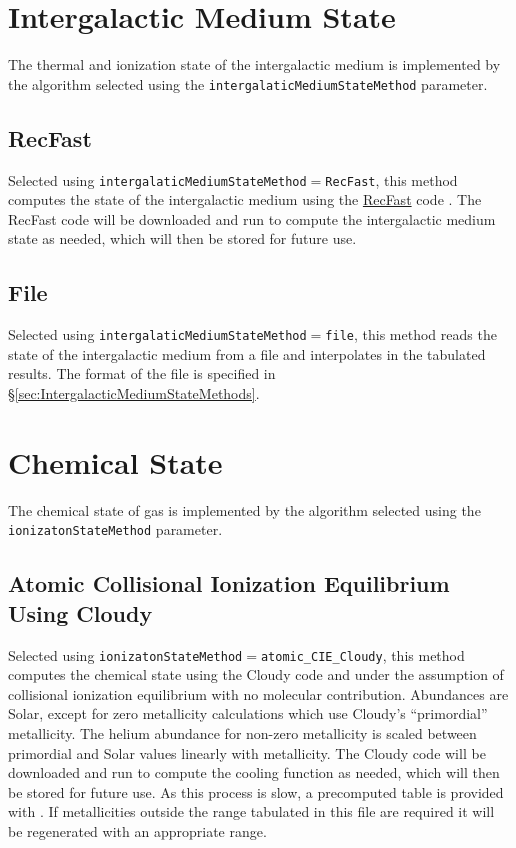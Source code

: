\section{Intergalactic Medium State}\label{sec:IntergalacticMediumStateMethod}

The thermal and ionization state of the intergalactic medium is implemented by the algorithm selected using the {\tt intergalaticMediumStateMethod} parameter.

\subsection{{\sc RecFast}}

Selected using {\tt intergalaticMediumStateMethod}$=${\tt RecFast}, this method computes the state of the intergalactic medium using the \href{http://www.astro.ubc.ca/people/scott/recfast.html}{{\sc RecFast}} code \cite{seager_how_2000,wong_how_2008}. The {\sc RecFast} code will be downloaded and run to compute the intergalactic medium state as needed, which will then be stored for future use.

\subsection{File}

Selected using {\tt intergalaticMediumStateMethod}$=${\tt file}, this method reads the state of the intergalactic medium from a file and interpolates in the tabulated results. The format of the file is specified in \S\ref{sec:IntergalacticMediumStateMethods}.

\section{Chemical State}\label{sec:ChemicalStateMethod}

The chemical state of gas is implemented by the algorithm selected using the {\tt ionizatonStateMethod} parameter.

\subsection{Atomic Collisional Ionization Equilibrium Using {\sc Cloudy}}

Selected using {\tt ionizatonStateMethod}$=${\tt atomic\_CIE\_Cloudy}, this method computes the chemical state using the {\sc Cloudy} code and under the assumption of collisional ionization equilibrium with no molecular contribution. Abundances are Solar, except for zero metallicity calculations which use {\sc Cloudy}'s ``primordial'' metallicity. The helium abundance for non-zero metallicity is scaled between primordial and Solar values linearly with metallicity. The {\sc Cloudy} code will be downloaded and run to compute the cooling function as needed, which will then be stored for future use. As this process is slow, a precomputed table is provided with \glc. If metallicities outside the range tabulated in this file are required it will be regenerated with an appropriate range.

